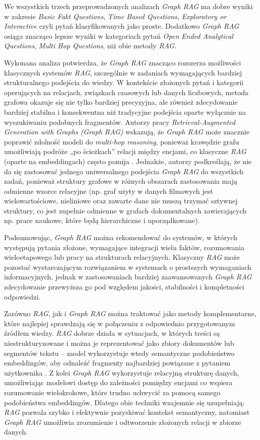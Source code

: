 \documentclass[
a4paper,
12pt,
]{article}
\begin{document}
We wszystkich trzech przeprowadzonych analizach \textit{Graph RAG} ma dobre wyniki w zakresie \textit{Basic Fakt Questions}, \textit{Time Based Questions},  \textit{Exploratory or Interactive} czyli pytań klasyfikowanych jako proste. Dodatkowo \textit{Graph RAG} osiąga znacząco lepsze wyniki w kategoriach pytań \textit{Open Ended Analytical Questions}, \textit{Multi Hop Questions}, niż obie metody \textit{RAG}. 

Wykonana analiza potwierdza, że \textit{Graph RAG} znacząco rozszerza możliwości klasycznych systemów \textit{RAG}, szczególnie w zadaniach wymagających bardziej strukturalnego podejścia do wiedzy. W kontekście złożonych pytań i kategorii operujących na relacjach, związkach czasowych lub danych liczbowych, metoda grafowa okazuje się nie tylko bardziej precyzyjna, ale również zdecydowanie bardziej stabilna i konsekwentna niż tradycyjne podejścia oparte wyłącznie na wyszukiwaniu podobnych fragmentów. Autorzy pracy \textit{Retrieval-Augmented Generation with Graphs (Graph RAG)}  wskazują, że \textit{Graph RAG} może znacznie poprawić zdolność modeli do \textit{multi-hop reasoning}, ponieważ krawędzie grafu umożliwiają podróże „po ścieżkach” relacji między encjami, co klasyczne \textit{RAG} (oparte na embeddingach) często pomija \cite{graphRAG}. Jednakże, autorzy podkreślają, że nie da się zastosować jednego uniwersalnego podejścia \textit{Graph RAG } do wszystkich zadań, ponieważ struktury grafowe w różnych obszarach zastosowania mają odmienne wzorce relacyjne (np. graf użyty w danych filmowych jest wielowartościowe, nieliniowe oraz zawarte dane nie muszą trzymać sztywnej struktury, co jest zupełnie odmienne w grafach dokumentalnych zawierających np. prace naukowe, które będą hierarchiczne i uporządkowane). 

Podsumowując, \textit{Graph RAG} można rekomendować do systemów, w których występują pytania złożone, wymagające integracji wielu faktów, rozumowania wieloetapowego lub pracy na strukturach relacyjnych. Klasyczny \textit{RAG }może pozostać wystarczającym rozwiązaniem w systemach o prostszych wymaganiach informacyjnych, jednak w zastosowaniach bardziej zaawansowanych \textit{Graph RAG} zdecydowanie przewyższa go pod względem jakości, stabilności i kompletności odpowiedzi.

Zarówno \textit{RAG}, jak i\textit{ Graph RAG} można traktować jako metody komplementarne, które najlepiej sprawdzają się w połączeniu z odpowiednio przygotowanym źródłem wiedzy. \textit{RAG} dobrze działa w sytuacjach, w których treści są niestrukturyzowane i można je reprezentować jako zbiory dokumentów lub segmentów tekstu – model wykorzystuje wtedy semantyczne podobieństwo embeddingów, aby odnaleźć fragmenty najbardziej powiązane z pytaniem użytkownika \cite{rag}. Z kolei \textit{Graph RAG} wykorzystuje relacyjną strukturę danych, umożliwiając modelowi dostęp do zależności pomiędzy encjami co wspiera rozumowanie wielokrokowe, które trudno uchwycić za pomocą samego podobieństwa embeddingów. Dlatego obie techniki wzajemnie się uzupełniają: \textit{RAG }pozwala szybko i efektywnie pozyskiwać kontekst semantyczny, natomiast \textit{Graph RAG }umożliwia zrozumienie i odtworzenie złożonych relacji w zbiorze danych. 
\end{document}
